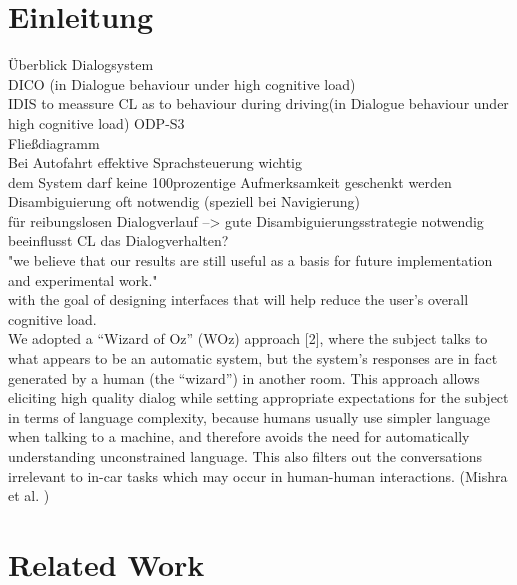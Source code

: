 \documentclass[12pt,a4paper]{scrartcl}
\begin{document}
\section{Einleitung}
Überblick Dialogsystem\\
DICO (in Dialogue behaviour under high cognitive load)\\
IDIS to meassure CL as to behaviour during driving(in Dialogue behaviour under high cognitive load)
ODP-S3\\
Fließdiagramm\\
Bei Autofahrt effektive Sprachsteuerung wichtig \\
dem System darf keine 100prozentige Aufmerksamkeit geschenkt werden\\
Disambiguierung oft notwendig (speziell bei Navigierung)\\
für reibungslosen Dialogverlauf --> gute Disambiguierungsstrategie notwendig\\
beeinflusst CL das Dialogverhalten?\\
"we believe that our results are still useful as a basis
for future implementation and experimental work."\\
with the goal of designing
interfaces that will help reduce the user’s overall cognitive load.\\
We adopted a “Wizard of Oz” (WOz) approach [2], where the
subject talks to what appears to be an automatic system, but the
system’s responses are in fact generated by a human (the “wizard”)
in another room. This approach allows eliciting high quality
dialog while setting appropriate expectations for the subject
in terms of language complexity, because humans usually
use simpler language when talking to a machine, and therefore
avoids the need for automatically understanding unconstrained
language. This also filters out the conversations irrelevant to
in-car tasks which may occur in human-human interactions. (Mishra et al. )\\ 

\newpage
\section{Related Work}
\end{document}
